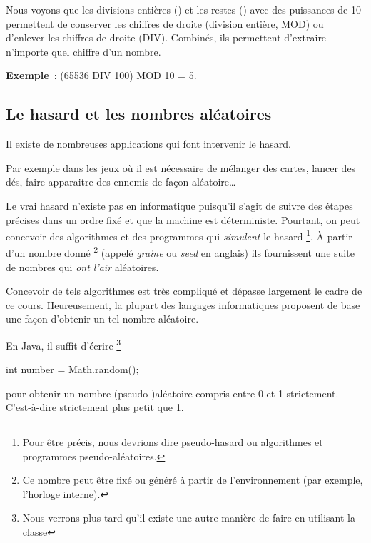 			Nous voyons que les divisions entières () et les restes
			() avec des puissances de 10 permettent de conserver les
			chiffres de droite (division entière, MOD) ou d'enlever les chiffres
			de droite (DIV).  Combinés, ils permettent d’extraire n’importe quel
			chiffre d’un nombre.
			
			\textbf{Exemple}~: (65536 DIV 100) MOD 10 = 5.


		
		\subsection{Le hasard et les nombres aléatoires}
			
			Il existe de nombreuses applications qui font intervenir le hasard.
		
			Par exemple dans les jeux où il est nécessaire de mélanger des
			cartes, lancer des dés, faire apparaitre des ennemis de façon
			aléatoire\dots
			
			Le vrai hasard n’existe pas en informatique
			puisqu’il s’agit de suivre des étapes précises
			dans un ordre fixé et que la machine est déterministe. 
			Pourtant, on peut concevoir des algorithmes et des programmes 
			qui \emph{simulent} le hasard%
			\footnote{%
				Pour être précis, nous devrions dire pseudo-hasard
				ou algorithmes et programmes pseudo-aléatoires.
			}.
			À partir d’un nombre donné%
			\footnote{%
				Ce nombre peut être fixé ou généré à partir
				de l’environnement 
				(par exemple, l’horloge interne).
			}
			(appelé \emph{graine} ou \emph{seed} en anglais)
			ils fournissent une suite de nombres qui \emph{ont l’air}
			aléatoires.			

			Concevoir de tels algorithmes est très compliqué et dépasse
			largement le cadre de ce cours.  Heureusement, la plupart des
			langages informatiques proposent de base une façon d'obtenir un tel
			nombre aléatoire.

			En Java, il suffit d'écrire
			\footnote{Nous verrons plus tard qu'il existe une autre manière 
				de faire en utilisant la classe }

			\begin{java}
int number = Math.random();				
			\end{java}

			pour obtenir un nombre (pseudo-)aléatoire compris entre 0 et 1 
			strictement. C'est-à-dire strictement plus petit que 1. 

